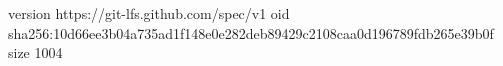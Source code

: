 version https://git-lfs.github.com/spec/v1
oid sha256:10d66ee3b04a735ad1f148e0e282deb89429c2108caa0d196789fdb265e39b0f
size 1004
